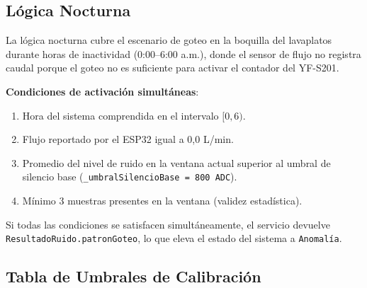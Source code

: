 \documentclass[12pt,a4paper]{article}
\begin{document}
\subsection{Lógica Nocturna}

La lógica nocturna cubre el escenario de goteo en la boquilla del lavaplatos durante horas de inactividad (0:00--6:00 a.m.), donde el sensor de flujo no registra caudal porque el goteo no es suficiente para activar el contador del YF-S201.

\textbf{Condiciones de activación simultáneas}:
\begin{enumerate}[noitemsep]
    \item Hora del sistema comprendida en el intervalo $[0, 6)$.
    \item Flujo reportado por el ESP32 igual a 0,0 L/min.
    \item Promedio del nivel de ruido en la ventana actual superior al umbral de silencio base (\texttt{\_umbralSilencioBase = 800 ADC}).
    \item Mínimo 3 muestras presentes en la ventana (validez estadística).
\end{enumerate}

Si todas las condiciones se satisfacen simultáneamente, el servicio devuelve \texttt{ResultadoRuido.patronGoteo}, lo que eleva el estado del sistema a \texttt{Anomalía}.

\subsection{Tabla de Umbrales de Calibración}
\end{document}
